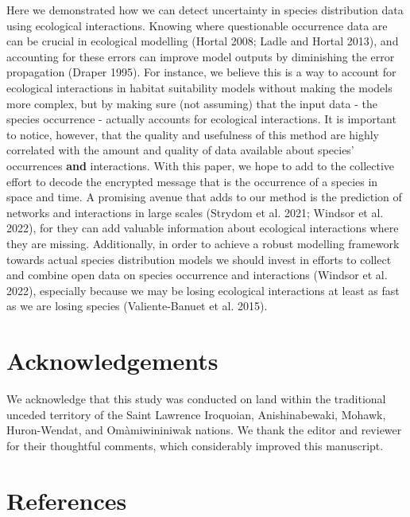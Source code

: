 \documentclass[10pt,oneside]{article}
\begin{document}
Here we demonstrated how we can detect uncertainty in species
distribution data using ecological interactions. Knowing where
questionable occurrence data are can be crucial in ecological modelling
(Hortal 2008; Ladle and Hortal 2013), and accounting for these errors
can improve model outputs by diminishing the error propagation (Draper
1995). For instance, we believe this is a way to account for ecological
interactions in habitat suitability models without making the models
more complex, but by making sure (not assuming) that the input data -
the species occurrence - actually accounts for ecological interactions.
It is important to notice, however, that the quality and usefulness of
this method are highly correlated with the amount and quality of data
available about species' occurrences \textbf{and} interactions. With
this paper, we hope to add to the collective effort to decode the
encrypted message that is the occurrence of a species in space and time.
A promising avenue that adds to our method is the prediction of networks
and interactions in large scales (Strydom et al. 2021; Windsor et al.
2022), for they can add valuable information about ecological
interactions where they are missing. Additionally, in order to achieve a
robust modelling framework towards actual species distribution models we
should invest in efforts to collect and combine open data on species
occurrence and interactions (Windsor et al. 2022), especially because we
may be losing ecological interactions at least as fast as we are losing
species (Valiente-Banuet et al. 2015).

\hypertarget{acknowledgements}{%
\section{Acknowledgements}\label{acknowledgements}}

We acknowledge that this study was conducted on land within the
traditional unceded territory of the Saint Lawrence Iroquoian,
Anishinabewaki, Mohawk, Huron-Wendat, and Omàmiwininiwak nations. We
thank the editor and reviewer for their thoughtful comments, which
considerably improved this manuscript.

\hypertarget{references}{%
\section*{References}\label{references}}
\end{document}
